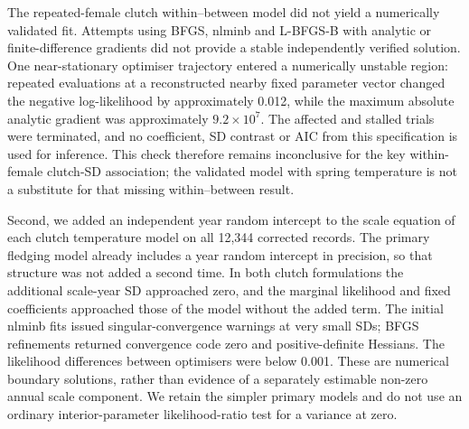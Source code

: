\documentclass{article}
\begin{document}
\begin{table}[!ht]\centering\scriptsize\singlespacing
\caption{Validated temperature contrasts on the repeated-female samples. Mean changes are eggs or percentage points of full-mixture fledging success per 1-degree increase. Consistency ratios refer to conditional clutch-size SD or beta-binomial component precision. Other continuous covariates and random effects are zero, and reference age class is yearling. Intervals use 6,000 joint coefficient draws. The clutch within--between fit did not pass numerical validation and is not reported.}\label{tab:repeat-temperature}
\end{table}

The repeated-female clutch within--between model did not yield a numerically validated fit. Attempts using BFGS, nlminb and L-BFGS-B with analytic or finite-difference gradients did not provide a stable independently verified solution. One near-stationary optimiser trajectory entered a numerically unstable region: repeated evaluations at a reconstructed nearby fixed parameter vector changed the negative log-likelihood by approximately 0.012, while the maximum absolute analytic gradient was approximately $9.2\times10^7$. The affected and stalled trials were terminated, and no coefficient, SD contrast or AIC from this specification is used for inference. This check therefore remains inconclusive for the key within-female clutch-SD association; the validated model with spring temperature is not a substitute for that missing within--between result.

Second, we added an independent year random intercept to the scale equation of each clutch temperature model on all 12,344 corrected records. The primary fledging model already includes a year random intercept in precision, so that structure was not added a second time. In both clutch formulations the additional scale-year SD approached zero, and the marginal likelihood and fixed coefficients approached those of the model without the added term. The initial nlminb fits issued singular-convergence warnings at very small SDs; BFGS refinements returned convergence code zero and positive-definite Hessians. The likelihood differences between optimisers were below 0.001. These are numerical boundary solutions, rather than evidence of a separately estimable non-zero annual scale component. We retain the simpler primary models and do not use an ordinary interior-parameter likelihood-ratio test for a variance at zero.
\end{document}
